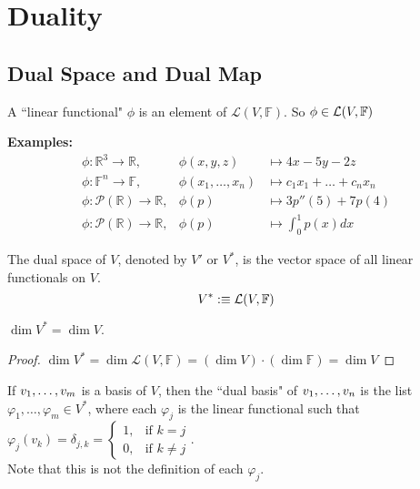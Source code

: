 \section{Duality}
\subsection{Dual Space and Dual Map}

\setcounter{thm}{107}
\begin{mydef}
  A ``linear functional" $\phi$ is an element of $\mathcal{L}(V, \mathbb{F})$. So $\phi \in \mathcal{L}(V, \mathbb{F})$
\end{mydef}

\textbf{Examples:}
\begin{equation}
  \begin{array}{lll}
    \phi: \mathbb{R}^3  \to \mathbb{R}, &\phi (x,y,z)  & \mapsto 4x-5y-2z \\
    \phi: \mathbb{F}^n  \to \mathbb{F}, &\phi (x_1, \dots, x_n)
    & \mapsto c_1x_1 + \dots + c_nx_n  \\
    \phi: \mathcal{P} (\mathbb{R})  \to \mathbb{R},
    & \phi(p) & \mapsto 3p''(5) + 7p(4) \\
    \phi: \mathcal{P}(\mathbb{R}) \to \mathbb{R},
    & \phi(p)  &\mapsto \textstyle \int_{0}^{1} p(x) dx
  \end{array}
\end{equation}

\setcounter{thm}{109}
\begin{thm}
  The dual space of $V$, denoted by $V'$ or $V^{*}$, is the vector space of all linear functionals on $V$.
  \begin{equation}
    V^{*} :\equiv \mathcal{L}(V, \mathbb{F})
  \end{equation}
\end{thm}

\begin{thm}
  $\dim V^{*} = \dim V$.
\end{thm}
\begin{proof}
  $\dim V^{*} = \dim \mathcal{L}(V, \mathbb{F})=(\dim V) \cdot (\dim \mathbb{F}) = \dim V $
\end{proof}


\begin{mydef}
  If $v_1, \dots, v_m$ is a basis of $V$, then the ``dual basis" of $v_1, \dots, v_n$ is the list $\varphi_1, \dots, \varphi_m \in V^{*}$, where each $\varphi_j$ is the linear functional such that
  $\varphi_j(v_k) = \delta_{j,k} =
  \begin{cases}
    1,  & \text{if $k=j$} \\
    0, & \text{if $k \neq j$}
  \end{cases}$. \\
  Note that this is not the definition of each $\varphi_j$.
\end{mydef}


